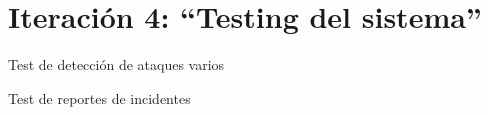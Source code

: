 \chapter{Iteración 4: “Testing del sistema”}
    \begin{section}{Test de detección de ataques varios}
    \end{section}
    \begin{section}{Test de reportes de incidentes}
    \end{section}
   